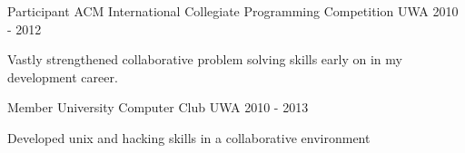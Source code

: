 \begin{cventries}
  \cventry
    {Participant} %
    {ACM International Collegiate Programming Competition} %
    {UWA} %
    {2010 - 2012} %
    {
      \begin{cvitems} %
        \item {Vastly strengthened collaborative problem solving skills early on in my development career.}
      \end{cvitems}
    }

  \cventry
    {Member} %
    {University Computer Club} %
    {UWA} %
    {2010 - 2013} %
    {
      \begin{cvitems} %
        \item {Developed unix and hacking skills in a collaborative environment}
      \end{cvitems}
    }

\end{cventries}
